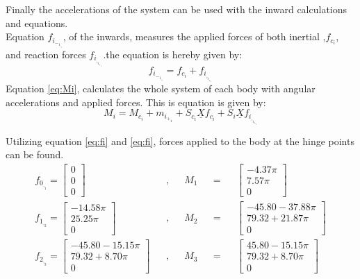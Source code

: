 Finally the accelerations of the system can be used with the inward calculations and equations.\\
Equation \(f_i_-_1_,_i\), of the inwards, measures the applied forces of both inertial ,\(f_c_i\), and reaction forces \(f_i_,_i_+_1\).the equation is hereby given by:\\
\begin{equation}\label{eq:fi}
    f_i_-_1_,_i=f_c_i+f_i_,_i_+_1
\end{equation} 
Equation \ref{eq:Mi}, calculates the whole system of each body with angular accelerations and applied forces. This is equation is given by:\\
\begin{equation}\label{eq:Mi}
    M_i=M_c_i+m_i_+_1+S_c_i\underline{X}f_c_i+S_i\underline{X}f_i_,_i_+_i
\end{equation} 

Utilizing equation \ref{eq:fi} and \ref{eq:fi}, forces applied to the body at the hinge points can be found.\\

\begin{align}
    f_0_,_1=
\left[\begin{matrix}
    0\\
    0\\
    0
\end{matrix}\right]&& ,&&
M_1&&=&&\left[\begin{matrix}
    -4.37\pi\\
    7.57\pi\\
    0
\end{matrix}\right]\\
    f_1_,_2=
\left[\begin{matrix}
    -14.58\pi\\
    25.25\pi\\
    0
\end{matrix}\right]&&,&& 
M_2&&=&&
\left[\begin{matrix}
   -45.80-37.88\pi \\
    79.32+21.87\pi\\
    0
\end{matrix}\right]\\
    f_2_,_3=
\left[\begin{matrix}
    -45.80-15.15\pi\\
    79.32+8.70\pi\\
    0
\end{matrix}\right]&&,&& 
M_3&&=&&\left[\begin{matrix}
    45.80-15.15\pi\\
    79.32+8.70\pi\\
    0
\end{matrix}\right]
\end{align}
\\

